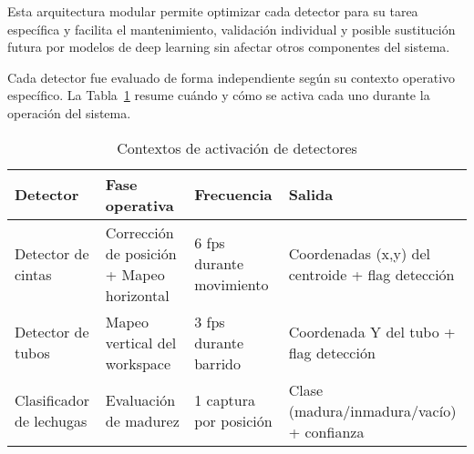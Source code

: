 Esta arquitectura modular permite optimizar cada detector para su tarea específica y facilita el mantenimiento, validación individual y posible sustitución futura por modelos de deep learning sin afectar otros componentes del sistema.


Cada detector fue evaluado de forma independiente según su contexto operativo específico. La Tabla~\ref{tab:contextos_detectores} resume cuándo y cómo se activa cada uno durante la operación del sistema.

\begin{table}[H]
\centering
\caption{Contextos de activación de detectores}
\label{tab:contextos_detectores}
\small
\begin{tabular}{|p{2.8cm}|p{3.2cm}|p{2.5cm}|p{4.5cm}|}
\hline
\textbf{Detector} & \textbf{Fase operativa} & \textbf{Frecuencia} & \textbf{Salida} \\ \hline
Detector de cintas & Corrección de posición + Mapeo horizontal & 6 fps durante movimiento & Coordenadas (x,y) del centroide + flag detección \\ \hline
Detector de tubos & Mapeo vertical del workspace & 3 fps durante barrido & Coordenada Y del tubo + flag detección \\ \hline
Clasificador de lechugas & Evaluación de madurez & 1 captura por posición & Clase (madura/inmadura/vacío) + confianza \\ \hline
\end{tabular}
\end{table}

